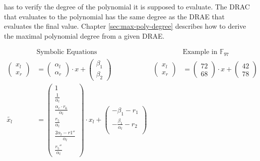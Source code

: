 \label{sec:checking-poly-degree}

\JWpTwo{} has to verify the degree of the polynomial it is supposed to evaluate.
The DRAC that evaluates to the polynomial has the same degree as the DRAE that
evaluates the final value. Chapter \ref{sec:max-poly-degree} describes how
to derive the maximal polynomial degree from a given DRAE.


%
%
\label{sec:example}



\begin{align*}
%
& \text{Symbolic Equations} & & \text{Example in }\mathbb{F}_{97}\\
%
\begin{pmatrix}x_l\\x_r\end{pmatrix} &=
\begin{pmatrix}\alpha_l\\\alpha_r\end{pmatrix}
\cdot x +
\begin{pmatrix}\beta_1\\\beta_2\end{pmatrix}
&
\begin{pmatrix}x_l\\x_r\end{pmatrix} &=
\begin{pmatrix}72\\68\end{pmatrix}
\cdot x +
\begin{pmatrix}42\\78\end{pmatrix}
\\
%
\widetilde{x_l} & =
\begin{pmatrix}
  1\\
  \frac{1}{\alpha_l}\\
  \frac{\alpha_r \cdot r_6}{\alpha_l}\\
  \frac{r_5}{\alpha_l}\\
  \frac{2\alpha_l-r1''}{\alpha_l}\\
  \frac{r_5''}{\alpha_l}
\end{pmatrix}
\cdot x_l +
\begin{pmatrix}
  -\beta_1-r_1\\
  -\frac{\beta_1}{\alpha_l}-r_2\\

\end{pmatrix}
\end{align*}

